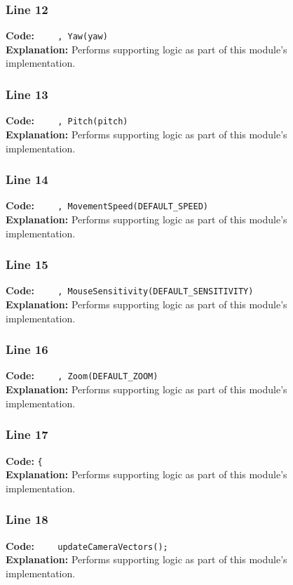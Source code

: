 \documentclass[11pt,a4paper]{article}
\begin{document}
\subsubsection*{Line 12}
\textbf{Code:} \verb|    , Yaw(yaw)|\\
\textbf{Explanation:} Performs supporting logic as part of this module's implementation.

\subsubsection*{Line 13}
\textbf{Code:} \verb|    , Pitch(pitch)|\\
\textbf{Explanation:} Performs supporting logic as part of this module's implementation.

\subsubsection*{Line 14}
\textbf{Code:} \verb|    , MovementSpeed(DEFAULT_SPEED)|\\
\textbf{Explanation:} Performs supporting logic as part of this module's implementation.

\subsubsection*{Line 15}
\textbf{Code:} \verb|    , MouseSensitivity(DEFAULT_SENSITIVITY)|\\
\textbf{Explanation:} Performs supporting logic as part of this module's implementation.

\subsubsection*{Line 16}
\textbf{Code:} \verb|    , Zoom(DEFAULT_ZOOM)|\\
\textbf{Explanation:} Performs supporting logic as part of this module's implementation.

\subsubsection*{Line 17}
\textbf{Code:} \verb|{|\\
\textbf{Explanation:} Performs supporting logic as part of this module's implementation.

\subsubsection*{Line 18}
\textbf{Code:} \verb|    updateCameraVectors();|\\
\textbf{Explanation:} Performs supporting logic as part of this module's implementation.
\end{document}
